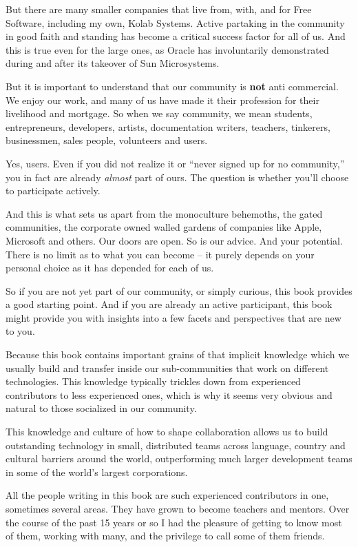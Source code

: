 But there are many smaller companies that live from, with, and for
Free Software, including my own, Kolab Systems. Active partaking in
the community in good faith and standing has become a critical success
factor for all of us. And this is true even for the large ones, as
Oracle has involuntarily demonstrated during and after its takeover of
Sun Microsystems.

But it is important to understand that our community is \textbf{not}
anti commercial. We enjoy our work, and many of us have made it their
profession for their livelihood and mortgage. So when we say
community, we mean students, entrepreneurs, developers, artists,
documentation writers, teachers, tinkerers, businessmen, sales people,
volunteers and users.

Yes, users. Even if you did not realize it or ``never signed up for no
community,'' you in fact are already \emph{almost} part of ours. The
question is whether you'll choose to participate actively.

And this is what sets us apart from the monoculture behemoths, the
gated communities, the corporate owned walled gardens of companies
like Apple, Microsoft and others. Our doors are open. So is our
advice. And your potential. There is no limit as to what you can
become -- it purely depends on your personal choice as it has
depended for each of us.

So if you are not yet part of our community, or simply curious, this
book provides a good starting point. And if you are already an active
participant, this book might provide you with insights into a few
facets and perspectives that are new to you.

Because this book contains important grains of that implicit
knowledge which we usually build and transfer inside our
sub-communities that work on different technologies. This knowledge
typically trickles down from experienced contributors to less
experienced ones, which is why it seems very obvious and
natural to those socialized in our community.

This knowledge and culture of how to shape collaboration allows us to
build outstanding technology in small, distributed teams across
language, country and cultural barriers around the world,
outperforming much larger development teams in some of the world's
largest corporations.

All the people writing in this book are such experienced contributors
in one, sometimes several areas. They have grown to become teachers
and mentors. Over the course of the past 15 years or so I had the
pleasure of getting to know most of them, working with many, and the
privilege to call some of them friends. 

